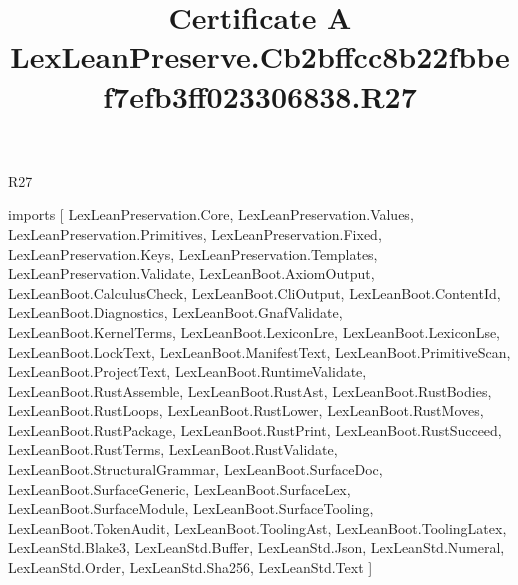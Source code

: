 \begin{lexlean}{R27}
\title{Certificate A LexLeanPreserve.Cb2bffcc8b22fbbef7efb3ff023306838.R27}
\begin{coremodule}
imports [
  LexLeanPreservation.Core,
  LexLeanPreservation.Values,
  LexLeanPreservation.Primitives,
  LexLeanPreservation.Fixed,
  LexLeanPreservation.Keys,
  LexLeanPreservation.Templates,
  LexLeanPreservation.Validate,
  LexLeanBoot.AxiomOutput,
  LexLeanBoot.CalculusCheck,
  LexLeanBoot.CliOutput,
  LexLeanBoot.ContentId,
  LexLeanBoot.Diagnostics,
  LexLeanBoot.GnafValidate,
  LexLeanBoot.KernelTerms,
  LexLeanBoot.LexiconLre,
  LexLeanBoot.LexiconLse,
  LexLeanBoot.LockText,
  LexLeanBoot.ManifestText,
  LexLeanBoot.PrimitiveScan,
  LexLeanBoot.ProjectText,
  LexLeanBoot.RuntimeValidate,
  LexLeanBoot.RustAssemble,
  LexLeanBoot.RustAst,
  LexLeanBoot.RustBodies,
  LexLeanBoot.RustLoops,
  LexLeanBoot.RustLower,
  LexLeanBoot.RustMoves,
  LexLeanBoot.RustPackage,
  LexLeanBoot.RustPrint,
  LexLeanBoot.RustSucceed,
  LexLeanBoot.RustTerms,
  LexLeanBoot.RustValidate,
  LexLeanBoot.StructuralGrammar,
  LexLeanBoot.SurfaceDoc,
  LexLeanBoot.SurfaceGeneric,
  LexLeanBoot.SurfaceLex,
  LexLeanBoot.SurfaceModule,
  LexLeanBoot.SurfaceTooling,
  LexLeanBoot.TokenAudit,
  LexLeanBoot.ToolingAst,
  LexLeanBoot.ToolingLatex,
  LexLeanStd.Blake3,
  LexLeanStd.Buffer,
  LexLeanStd.Json,
  LexLeanStd.Numeral,
  LexLeanStd.Order,
  LexLeanStd.Sha256,
  LexLeanStd.Text
]


\end{coremodule}
\end{lexlean}
